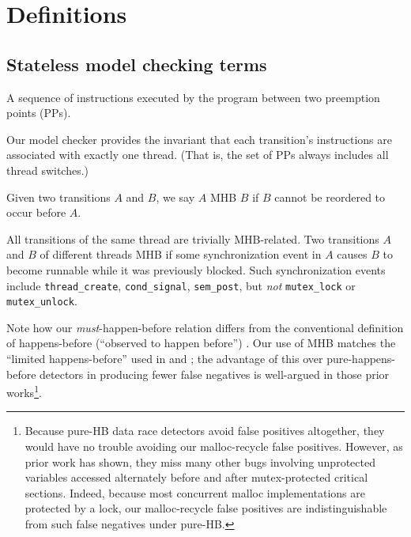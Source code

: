 \section{Definitions}

\subsection{Stateless model checking terms}

\begin{definition}[Transition]
A sequence of instructions executed by the program between two preemption points (PPs).
\label{def:transition}
\end{definition}
Our model checker provides the invariant that each transition's instructions are associated with exactly one thread. (That is, the set of PPs always includes all thread switches.)

\begin{definition}
	Given two transitions $A$ and $B$, we say $A$ MHB $B$ if $B$ cannot be reordered to occur before $A$.
\end{definition}
All transitions of the same thread are trivially MHB-related.
Two transitions $A$ and $B$ of different threads MHB if some synchronization event in $A$ causes $B$ to become runnable while it was previously blocked. Such synchronization events include {\tt thread\_create}, {\tt cond\_signal}, {\tt sem\_post}, but {\em not} {\tt mutex\_lock} or {\tt mutex\_unlock}.

Note how our {\em must}-happen-before relation differs from the conventional definition of happens-before (``observed to happen before'') \cite{lamport-clocks}.
Our use of MHB matches the ``limited happens-before'' used in \cite{hybriddatarace} and \cite{tsan};
the advantage of this over pure-happens-before detectors in producing fewer false negatives is well-argued in those prior works\footnote{
Because pure-HB data race detectors avoid false positives altogether, they would have no trouble avoiding our malloc-recycle false positives.
However, as prior work has shown, they miss many other bugs involving unprotected variables accessed alternately before and after mutex-protected critical sections.
Indeed, because most concurrent malloc implementations are protected by a lock,
our malloc-recycle false positives are indistinguishable from such false negatives under pure-HB.
}.


